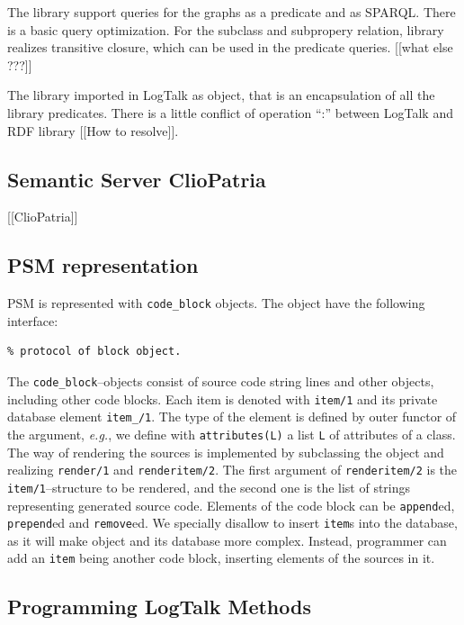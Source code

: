 \documentclass[conference]{IEEEtran}
\begin{document}
The library support queries for the graphs as a predicate and as SPARQL.  There is a basic query optimization.  For the subclass and subpropery relation, library realizes transitive closure, which can be used in the predicate queries.  [[what else ???]]

The library imported in LogTalk as object, that is an encapsulation of all the library predicates.  There is a little conflict of operation ``:'' between LogTalk and RDF library [[How to resolve]].

\subsection{Semantic Server ClioPatria}
\label{sec:clio-descr}
[[ClioPatria]]

\subsection{PSM representation}
\label{sec:blocks}

PSM is represented with \texttt{code\_block} objects.  The object have the following interface:
\begin{verbatim}
% protocol of block object.
\end{verbatim}

The \verb|code_block|--objects consist of source code string lines and other objects, including other code blocks. Each item is denoted with \verb|item/1| and its private database element \verb|item_/1|.  The type of the element is defined by outer functor of the argument, \emph{e.g.}, we define with \verb|attributes(L)| a list \verb|L| of attributes of a class.  The way of rendering the sources is implemented by subclassing the object and realizing \verb|render/1| and \verb|renderitem/2|.  The first argument of \verb|renderitem/2| is the \verb|item/1|--structure to be rendered, and the second one is the list of strings representing generated source code.  Elements of the code block can be \verb|append|ed, \verb|prepend|ed and \verb|remove|ed.  We specially disallow to insert \verb|item|s into the database, as it will make object and its database more complex.  Instead, programmer can add an \verb|item| being another code block, inserting elements of the sources in it.


\subsection{Programming LogTalk Methods}
\label{sec:lgt-methods}
\end{document}
